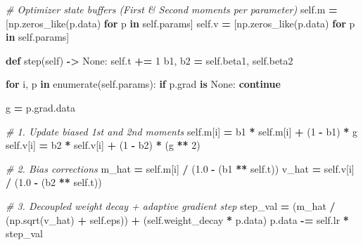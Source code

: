 \documentclass[
  letterpaper,
]{scrbook}
\newenvironment{Shaded}{\begin{snugshade}}{\end{snugshade}}
\newcommand{\BuiltInTok}[1]{#1}
\newcommand{\CommentTok}[1]{\textcolor[rgb]{0.56,0.35,0.01}{\textit{#1}}}
\newcommand{\ControlFlowTok}[1]{\textcolor[rgb]{0.13,0.29,0.53}{\textbf{#1}}}
\newcommand{\DecValTok}[1]{\textcolor[rgb]{0.00,0.00,0.81}{#1}}
\newcommand{\FloatTok}[1]{\textcolor[rgb]{0.00,0.00,0.81}{#1}}
\newcommand{\KeywordTok}[1]{\textcolor[rgb]{0.13,0.29,0.53}{\textbf{#1}}}
\newcommand{\NormalTok}[1]{#1}
\newcommand{\OperatorTok}[1]{\textcolor[rgb]{0.81,0.36,0.00}{\textbf{#1}}}
\newcommand{\VariableTok}[1]{\textcolor[rgb]{0.00,0.00,0.00}{#1}}
\begin{document}
\begin{Shaded}
\begin{Highlighting}[]
        \CommentTok{\# Optimizer state buffers (First \& Second moments per parameter)}
        \VariableTok{self}\NormalTok{.m }\OperatorTok{=}\NormalTok{ [np.zeros\_like(p.data) }\ControlFlowTok{for}\NormalTok{ p }\KeywordTok{in} \VariableTok{self}\NormalTok{.params]}
        \VariableTok{self}\NormalTok{.v }\OperatorTok{=}\NormalTok{ [np.zeros\_like(p.data) }\ControlFlowTok{for}\NormalTok{ p }\KeywordTok{in} \VariableTok{self}\NormalTok{.params]}

    \KeywordTok{def}\NormalTok{ step(}\VariableTok{self}\NormalTok{) }\OperatorTok{{-}\textgreater{}} \VariableTok{None}\NormalTok{:}
        \VariableTok{self}\NormalTok{.t }\OperatorTok{+=} \DecValTok{1}
\NormalTok{        b1, b2 }\OperatorTok{=} \VariableTok{self}\NormalTok{.beta1, }\VariableTok{self}\NormalTok{.beta2}

        \ControlFlowTok{for}\NormalTok{ i, p }\KeywordTok{in} \BuiltInTok{enumerate}\NormalTok{(}\VariableTok{self}\NormalTok{.params):}
            \ControlFlowTok{if}\NormalTok{ p.grad }\KeywordTok{is} \VariableTok{None}\NormalTok{:}
                \ControlFlowTok{continue}

\NormalTok{            g }\OperatorTok{=}\NormalTok{ p.grad.data}

            \CommentTok{\# 1. Update biased 1st and 2nd moments}
            \VariableTok{self}\NormalTok{.m[i] }\OperatorTok{=}\NormalTok{ b1 }\OperatorTok{*} \VariableTok{self}\NormalTok{.m[i] }\OperatorTok{+}\NormalTok{ (}\DecValTok{1} \OperatorTok{{-}}\NormalTok{ b1) }\OperatorTok{*}\NormalTok{ g}
            \VariableTok{self}\NormalTok{.v[i] }\OperatorTok{=}\NormalTok{ b2 }\OperatorTok{*} \VariableTok{self}\NormalTok{.v[i] }\OperatorTok{+}\NormalTok{ (}\DecValTok{1} \OperatorTok{{-}}\NormalTok{ b2) }\OperatorTok{*}\NormalTok{ (g }\OperatorTok{**} \DecValTok{2}\NormalTok{)}

            \CommentTok{\# 2. Bias corrections}
\NormalTok{            m\_hat }\OperatorTok{=} \VariableTok{self}\NormalTok{.m[i] }\OperatorTok{/}\NormalTok{ (}\FloatTok{1.0} \OperatorTok{{-}}\NormalTok{ (b1 }\OperatorTok{**} \VariableTok{self}\NormalTok{.t))}
\NormalTok{            v\_hat }\OperatorTok{=} \VariableTok{self}\NormalTok{.v[i] }\OperatorTok{/}\NormalTok{ (}\FloatTok{1.0} \OperatorTok{{-}}\NormalTok{ (b2 }\OperatorTok{**} \VariableTok{self}\NormalTok{.t))}

            \CommentTok{\# 3. Decoupled weight decay + adaptive gradient step}
\NormalTok{            step\_val }\OperatorTok{=}\NormalTok{ (m\_hat }\OperatorTok{/}\NormalTok{ (np.sqrt(v\_hat) }\OperatorTok{+} \VariableTok{self}\NormalTok{.eps)) }\OperatorTok{+}\NormalTok{ (}\VariableTok{self}\NormalTok{.weight\_decay }\OperatorTok{*}\NormalTok{ p.data)}
\NormalTok{            p.data }\OperatorTok{{-}=} \VariableTok{self}\NormalTok{.lr }\OperatorTok{*}\NormalTok{ step\_val}
\end{Highlighting}
\end{Shaded}
\end{document}
